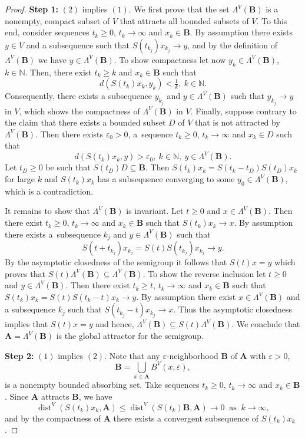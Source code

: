 \documentclass[a4paper,12pt,reqno]{amsart}
\theoremstyle{plain}
\theoremstyle{definition}
\numberwithin{equation}{section}
\newcommand{\N}{\mathbb{N}}
\newcommand{\eps}{\varepsilon}
\newcommand{\dist}{\operatorname{dist}}
\renewcommand{\geq}{\geqslant}
\renewcommand{\leq}{\leqslant}
\begin{document}
\begin{proof}
\textbf{Step 1:} $(2)$ implies $(1)$. We first prove that the set $\Lambda^{V}(\mathbf{B})$ is a nonempty, compact subset of $V$ that attracts all bounded
subsets of $V$. To this end, consider sequences $t_k\geq 0$, $t_k\to\infty$ and $x_k\in \mathbf{B}$.
By assumption there exists $y\in V$ and a subsequence  such that
$S(t_{k_j})x_{k_j}\to y$, and by the definition of $\Lambda^{V}(\mathbf{B})$ we have $y\in \Lambda^{V}(\mathbf{B})$.
To show compactness let now $y_k\in\Lambda^{V}(\mathbf{B})$, $k\in\N$. Then, there exist  $t_{k}\geq k$ and $x_k\in \mathbf{B}$ such that
$$d(S(t_k)x_k,y_k)<\tfrac{1}{k},\ k\in\N.$$
Consequently, there exists a subsequence $y_{k_j}$ and $y\in\Lambda^{V}(\mathbf{B})$ such that $y_{k_j}\to y$ in $V$,
which shows the compactness of $\Lambda^{V}(\mathbf{B})$ in $V$. Finally, suppose contrary to the claim that 
there exists a bounded subset $D$ of $V$ that is not attracted by $\Lambda^{V}(\mathbf{B})$.
Then there exists $\eps_0>0$, a~sequence $t_k\geq 0$, $t_k\to\infty$ and $x_k\in D$ such that
$$d(S(t_k)x_k,y)>\eps_0,\ k\in\N,\ y\in\Lambda^{V}(\mathbf{B}).$$
Let $t_{D}\geq0$ be such that $S(t_D)D\subseteq \mathbf{B}$. Then $S(t_k)x_{k}=S(t_k-t_{D})S(t_{D})x_k$ for large $k$ and $S(t_k)x_{k}$ has a 
subsequence converging to some $y_0\in\Lambda^{V}(\mathbf{B})$, which is a contradiction.

It remains to show that $\Lambda^{V}(\mathbf{B})$ is invariant. Let $t\geq 0$ and $x\in\Lambda^{V}(\mathbf{B})$. Then there exist $t_{k}\geq0$, $t_{k}\to\infty$ and $x_{k}\in \mathbf{B}$ such that $S(t_k)x_k\to x$.
By assumption there exists a~subsequence $k_{j}$ and $y\in\Lambda^{V}(\mathbf{B})$ such that
$$S(t+t_{k_j})x_{k_j}=S(t)S(t_{k_j})x_{k_{j}}\to y.$$
By the asymptotic closedness of the semigroup it follows that $S(t)x=y$ which proves that $S(t)\Lambda^{V}(\mathbf{B})\subseteq\Lambda^{V}(\mathbf{B})$.
To show the reverse inclusion let  $t\geq 0$ and $y\in\Lambda^{V}(\mathbf{B})$. Then there exist  $t_k\geq t$, $t_{k}\to\infty$
and $x_{k}\in \mathbf{B}$ such that
$S(t_k)x_{k}=S(t)S(t_k-t)x_{k}\to y.$
By assumption there exist $x\in\Lambda^{V}(\mathbf{B})$ and a subsequence $k_{j}$ such that $S(t_{k_j}-t)x_{k_j}\to x.$
Thus the asymptotic closedness implies that $S(t)x=y$ and hence, $\Lambda^{V}(\mathbf{B})\subseteq S(t)\Lambda^{V}(\mathbf{B})$.
We conclude that $\mathbf{A}=\Lambda^{V}(\mathbf{B})$ is the global attractor for the semigroup.

\textbf{Step 2:} $(1)$ implies $(2)$.
Note that any $\eps$-neighborhood $\mathbf{B}$ of $\mathbf{A}$ with $\eps>0$,
$$\mathbf{B}=\bigcup_{x\in\mathbf{A}}B^{V}(x,\eps),$$
is a nonempty bounded absorbing set. Take sequences $t_k\geq0$, $t_k\to\infty$ and $x_{k}\in \mathbf{B}$.
Since $\mathbf{A}$ attracts $\mathbf{B}$, we have
$$\dist^{V}(S(t_k)x_k,\mathbf{A})\leq\dist^{V}(S(t_k)\mathbf{B},\mathbf{A})\to 0\ \text{ as }\ k\to\infty,$$
and by the compactness of $\mathbf{A}$ there exists a convergent subsequence of $S(t_k)x_k$.


\end{proof}
\end{document}
